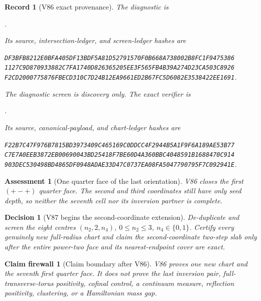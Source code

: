 \documentclass[11pt,oneside]{article}
\newtheorem{assessment}[theorem]{Assessment}
\newtheorem{firewall}[theorem]{Claim firewall}
\newtheorem{record}[theorem]{Record}
\newtheorem{decision}[theorem]{Decision}
\theoremstyle{definition}
\theoremstyle{remark}
\begin{document}
\begin{record}[V86 exact provenance]
\label{rec:newv86-provenance}
The diagnostic is
\begin{center}\footnotesize
{}.
\end{center}
Its source, intersection-ledger, and screen-ledger hashes are
\begin{center}\scriptsize
\texttt{DF3BFB8212E0BFA405DF13BDF5A81D52791570F0B668A738002B8FC1F9475386}\\
\texttt{1127C9D870933882C7FA1740D826365205EE3F565FB4B39A274D23CA503C8926}\\
\texttt{F2CD2000775876FBECD310C7D24B12EA9661ED2B67FC5D6082E3538422EE1691}.
\end{center}
The diagnostic screen is discovery only.  The exact verifier is
\begin{center}\footnotesize
{}.
\end{center}
Its source, canonical-payload, and chart-ledger hashes are
\begin{center}\scriptsize
\texttt{F22B7C47F976B7815BD3973409C465169C0DDCC4F2944B5A1F9F6A189AE53B77}\\
\texttt{C7E7A0EEB3872EB00690043BD25418F7BE60D4A360BBC4048591B1688470C914}\\
\texttt{903DEC530498BD4865DF0948ADAE33D47C0737EA08FA5047790795F7C092941E}.
\end{center}
\end{record}

\begin{assessment}[One quarter face of the last orientation]
\label{ass:newv86}
V86 closes the first \((+-+)\) quarter face.  The second and third
coordinates still have only seed depth, so neither the seventh cell
nor its inversion partner is complete.
\end{assessment}

\begin{decision}[V87 begins the second-coordinate extension]
\label{dec:newv86-next}
De-duplicate and screen the eight centres
\((n_2,2,n_4)\), \(0\leq n_2\leq3\),
\(n_4\in\{0,1\}\).  Certify every genuinely new full-radius chart
and claim the second-coordinate two-step slab only after the entire
power-two face and its nearest-endpoint cover are exact.
\end{decision}

\begin{firewall}[Claim boundary after V86]
\label{fire:newv86-final}
V86 proves one new chart and the seventh first quarter face.  It
does not prove the last inversion pair, full-transverse-torus
positivity, cofinal control, a continuum measure, reflection
positivity, clustering, or a Hamiltonian mass gap.
\end{firewall}
\end{document}
